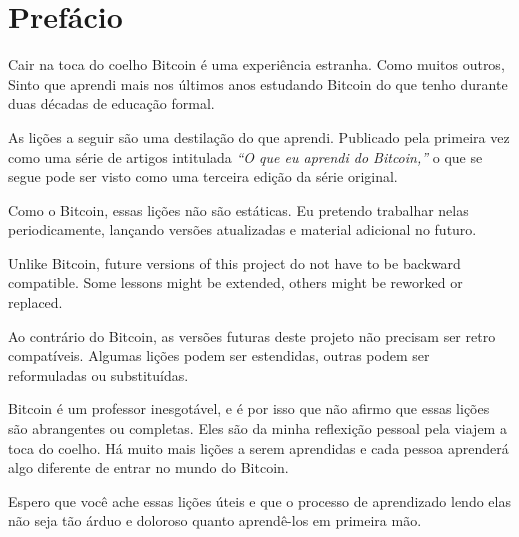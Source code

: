 \chapter*{Prefácio}

Cair na toca do coelho Bitcoin é uma experiência estranha. Como muitos outros,
Sinto que aprendi mais nos últimos anos estudando Bitcoin
do que tenho durante duas décadas de educação formal.

As lições a seguir são uma destilação do que aprendi. Publicado pela primeira vez
como uma série de artigos intitulada \textit{“O que eu aprendi do Bitcoin,”} o que se segue
pode ser visto como uma terceira edição da série original.

Como o Bitcoin, essas lições não são estáticas. Eu pretendo trabalhar nelas
periodicamente, lançando versões atualizadas e material adicional no futuro.

Unlike Bitcoin, future versions of this project do not have to be backward
compatible. Some lessons might be extended, others might be reworked or
replaced.

Ao contrário do Bitcoin, as versões futuras deste projeto não precisam ser retro
compatíveis. Algumas lições podem ser estendidas, outras podem ser reformuladas ou
substituídas.

Bitcoin é um professor inesgotável, e é por isso que não afirmo que essas
lições são abrangentes ou completas. Eles são da minha reflexição pessoal
pela viajem a toca do coelho. Há muito mais lições a serem aprendidas e
cada pessoa aprenderá algo diferente de entrar no mundo do Bitcoin.

Espero que você ache essas lições úteis e que o processo de aprendizado
lendo elas não seja tão árduo e doloroso quanto aprendê-los em primeira mão.

%
%
